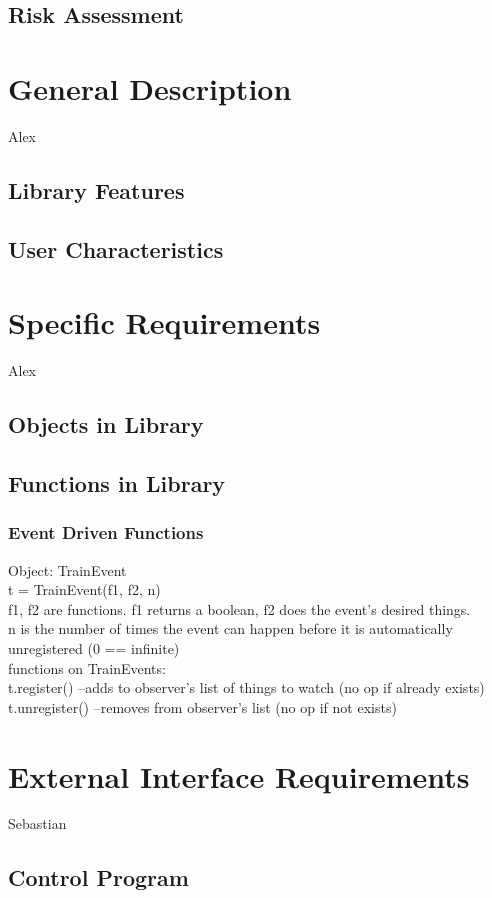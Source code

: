 \documentclass[a4paper,11pt,notitlepage]{article}
\begin{document}
\subsection{Risk Assessment}

\section{General Description}
Alex
\subsection{Library Features}
\subsection{User Characteristics}

\section{Specific Requirements}
Alex
\subsection{Objects in Library}
\subsection{Functions in Library}
\subsubsection{Event Driven Functions}
Object: TrainEvent
\\t = TrainEvent(f1, f2, n)
\\f1, f2 are functions. f1 returns a boolean, f2 does the event's desired things.
\\n is the number of times the event can happen before it is automatically unregistered (0 == infinite)
\\functions on TrainEvents:
\\t.register()	--adds to observer's list of things to watch (no op if already exists)
\\t.unregister()	--removes from observer's list (no op if not exists)

\section{External Interface Requirements}
Sebastian
\subsection{Control Program}
\end{document}
